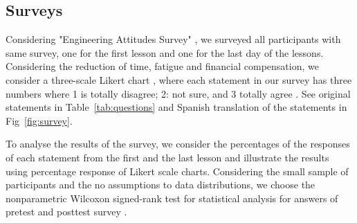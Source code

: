 \documentclass[sigconf]{acmart}
\begin{document}
\subsection{Surveys}
Considering "Engineering Attitudes Survey" \cite{cunningham2010impact}, we surveyed all participants with same survey, one for the first lesson and one for the last day of the lessons. 
Considering the reduction of time, fatigue and financial compensation, we consider a three-scale Likert chart \cite{jebb2021}, where each statement in our survey has three numbers where 1 is totally disagree; 2: not sure, and 3 totally agree .
See original statements in Table~\ref{tab:questions} and Spanish translation of the statements in Fig~\ref{fig:survey}.

To analyse the results of the survey, we consider the percentages of the responses of each statement from the first and the last lesson and illustrate the results using percentage response of Likert scale charts.
Considering the small sample of participants and the no assumptions to data distributions, we choose the nonparametric Wilcoxon signed-rank test for statistical analysis for answers of pretest and posttest survey \cite{scipy2001}.


\end{document}
